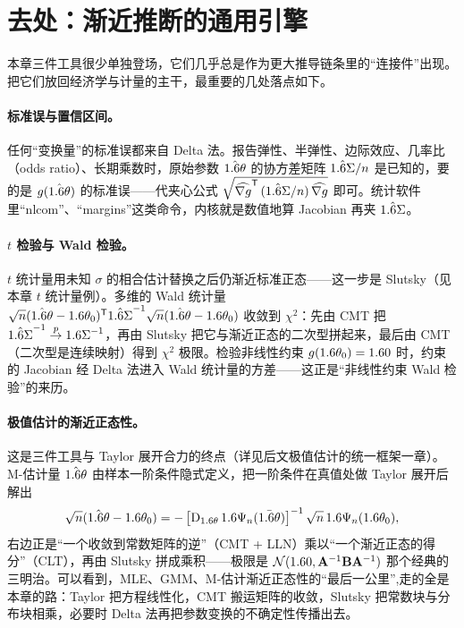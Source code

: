 
\section{去处：渐近推断的通用引擎}
\label{sec:slutsky-applications}

本章三件工具很少单独登场，它们几乎总是作为更大推导链条里的``连接件''出现。把它们放回经济学与计量的主干，最重要的几处落点如下。

\paragraph{标准误与置信区间。}
任何``变换量''的标准误都来自 Delta 法。报告弹性、半弹性、边际效应、几率比（odds ratio）、长期乘数时，原始参数 $\hat{1.6\theta}$ 的协方差矩阵 $\hat{1.6\Sigma}/n$ 是已知的，要的是 $g(\hat{1.6\theta})$ 的标准误——代夹心公式 $\sqrt{\widehat{\nabla g}^{\mathsf{T}}\,(\hat{1.6\Sigma}/n)\,\widehat{\nabla g}}$ 即可。统计软件里``nlcom''、``margins''这类命令，内核就是数值地算 Jacobian 再夹 $\hat{1.6\Sigma}$。

\paragraph{$t$ 检验与 Wald 检验。}
$t$ 统计量用未知 $\sigma$ 的相合估计替换之后仍渐近标准正态——这一步是 Slutsky（见本章 $t$ 统计量例）。多维的 Wald 统计量 $\sqrt{n}(\hat{1.6\theta}-1.6\theta_0)^{\mathsf{T}}{\hat{1.6\Sigma}}^{-1}\sqrt{n}(\hat{1.6\theta}-1.6\theta_0)$ 收敛到 $\chi^2$：先由 CMT 把 ${\hat{1.6\Sigma}}^{-1}\overset{p}{\to}{1.6\Sigma}^{-1}$，再由 Slutsky 把它与渐近正态的二次型拼起来，最后由 CMT（二次型是连续映射）得到 $\chi^2$ 极限。检验非线性约束 $g(1.6\theta_0)=1.6 0$ 时，约束的 Jacobian 经 Delta 法进入 Wald 统计量的方差——这正是``非线性约束 Wald 检验''的来历。

\paragraph{极值估计的渐近正态性。}
这是三件工具与 Taylor 展开合力的终点（详见后文极值估计的统一框架一章）。M-估计量 $\hat{1.6\theta}$ 由样本一阶条件隐式定义，把一阶条件在真值处做 Taylor 展开后解出
\[
    \sqrt{n}(\hat{1.6\theta}-1.6\theta_0)=-\left[\operatorname{D}_{1.6\theta}1.6\Psi_n(\bar{1.6\theta})\right]^{-1}\sqrt{n}\,1.6\Psi_n(1.6\theta_0),
\]
右边正是``一个收敛到常数矩阵的逆''（CMT + LLN）乘以``一个渐近正态的得分''（CLT），再由 Slutsky 拼成乘积——极限是 $\mathcal{N}(1.6 0,\mathbf{A}^{-1}\mathbf{B}\mathbf{A}^{-1})$ 那个经典的三明治。可以看到，MLE、GMM、M-估计渐近正态性的``最后一公里'',走的全是本章的路：Taylor 把方程线性化，CMT 搬运矩阵的收敛，Slutsky 把常数块与分布块相乘，必要时 Delta 法再把参数变换的不确定性传播出去。

